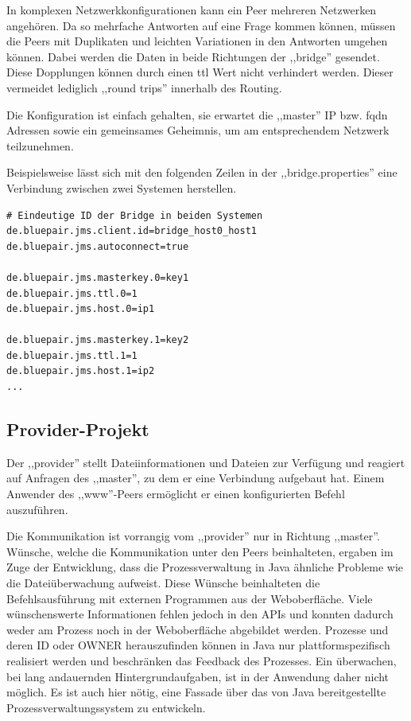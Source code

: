 \documentclass[oneside, ngerman, toc=bibliography,bibliography=totoc,listof=entryprefix, open=right,numbers=noenddot,fontsize=12pt]{scrbook}
\begin{document}
In komplexen Netzwerkkonfigurationen kann ein Peer mehreren Netzwerken angehören.
Da so mehrfache Antworten auf eine Frage kommen können, müssen die Peers mit Duplikaten und leichten Variationen in den Antworten umgehen können.
Dabei werden die Daten in beide Richtungen der ,,bridge'' gesendet. Diese Dopplungen können durch einen \acrfull{ttl} Wert nicht verhindert werden. Dieser vermeidet lediglich ,,round trips'' innerhalb des Routing.

Die Konfiguration ist einfach gehalten, sie erwartet die ,,master'' IP bzw. \acrfull{fqdn} Adressen sowie ein gemeinsames Geheimnis, um am entsprechendem Netzwerk teilzunehmen.

\bigskip
Beispielsweise lässt sich mit den folgenden Zeilen in der ,,bridge.properties'' eine Verbindung zwischen zwei Systemen herstellen.

\begin{verbatim}
# Eindeutige ID der Bridge in beiden Systemen
de.bluepair.jms.client.id=bridge_host0_host1
de.bluepair.jms.autoconnect=true

de.bluepair.jms.masterkey.0=key1
de.bluepair.jms.ttl.0=1
de.bluepair.jms.host.0=ip1

de.bluepair.jms.masterkey.1=key2
de.bluepair.jms.ttl.1=1
de.bluepair.jms.host.1=ip2
...
\end{verbatim}


\subsection{Provider-Projekt}
Der ,,provider'' stellt Dateiinformationen und Dateien zur Verfügung und reagiert auf Anfragen des ,,master'', zu dem er eine Verbindung aufgebaut hat.
Einem Anwender des ,,www''-Peers ermöglicht er einen konfigurierten Befehl auszuführen. 

Die Kommunikation ist vorrangig vom ,,provider'' nur in Richtung ,,master''. 
Wünsche, welche die Kommunikation unter den Peers beinhalteten, ergaben im Zuge der Entwicklung, dass die Prozessverwaltung in Java ähnliche Probleme wie die Dateiüberwachung aufweist. Diese Wünsche beinhalteten die Befehlsausführung mit externen Programmen aus der Weboberfläche. Viele wünschenswerte Informationen fehlen jedoch in den APIs und konnten dadurch weder am Prozess noch in der Weboberfläche abgebildet werden. Prozesse und deren ID oder OWNER herauszufinden können in Java nur plattformspezifisch realisiert werden und beschränken das Feedback des Prozesses. Ein überwachen, bei lang andauernden Hintergrundaufgaben, ist in der Anwendung daher nicht möglich. Es ist auch hier nötig, eine Fassade über das von Java bereitgestellte Prozessverwaltungssystem zu entwickeln.
\end{document}

